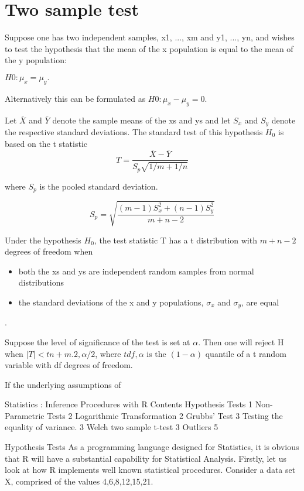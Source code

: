 \section{Two sample test}
Suppose one has two independent samples, x1, ..., xm and y1, ...,
yn, and wishes to test the hypothesis that the mean of the x
population is equal to the mean of the y population:

$H0 : \mu_{x} = \mu_{y}.$

Alternatively this can be formulated as $H0 : \mu_{x} - \mu_{y} =
0$.

Let $\bar{X}$ and $\bar{Y}$ denote the sample means of the xs and
ys and let $S_{x}$ and $S_{y}$ denote the respective standard
deviations. The standard test of this hypothesis $H_{0}$ is based
on the t statistic
\begin{equation}T = \frac{\bar{X} - \bar{Y} }{S_{p} \sqrt{1/m + 1/n} }
\end{equation}

where $S_{p}$ is the pooled standard deviation.

\begin{equation}
S_{p} = \sqrt{ \frac{(m-1)S^{2}_{x} +  (n-1)S^{2}_{y}}{m + n - 2}}
\end{equation}

Under the hypothesis $H_{0}$, the test statistic T has a t
distribution with $m + n - 2$ degrees of freedom when
\begin{itemize} \item both the xs and ys are independent random samples
from normal distributions \item the standard deviations of the x
and y populations, $\sigma_{x}$ and $\sigma_{y}$, are equal
\end{itemize}.

Suppose the level of significance of the test is set at $\alpha$.
Then one will reject H when $|T| < tn+m.2,\alpha/2$, where
$tdf,\alpha$ is the $(1 - \alpha)$ quantile of a t random variable
with df degrees of freedom.

If the underlying assumptions of

Statistics : Inference Procedures with R
Contents
Hypothesis Tests	1
Non-Parametric Tests	2
Logarithmic  Transformation	2
Grubbs’ Test	3
Testing the equality of variance.	3
Welch two sample t-test	3
Outliers	5

Hypothesis Tests
As a programming language designed for Statistics, it is obvious that R will have a substantial capability for Statistical Analysis.
Firstly, let us look at how R implements well known statistical procedures.  Consider a data set X, comprised of the values {4,6,8,12,15,21}.


